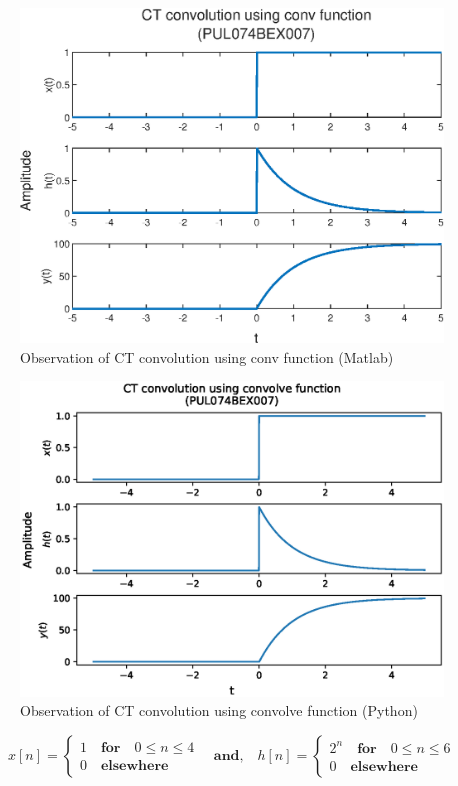 \documentclass{lab_sheet}
\begin{document}
\begin{figure}[H]
	\centering
	\includegraphics[width=0.73\linewidth]{../Figures/lab_3_2_b_ml.eps}
	\caption{Observation of CT convolution using conv function (Matlab)}
	\label{fig:3_2_b_ml}
\end{figure}
\begin{figure}[H]
	\centering
	\includegraphics[width=0.8\linewidth]{../Figures/lab_3_2_b_py.eps}
	\caption{Observation of CT convolution using convolve function (Python)}
	\label{fig:3_2_b_py}
\end{figure}
\begin{equation*}
	x[n]=\begin{cases}
		1 \quad \textbf{for} \quad 0\leq n \leq 4 \\
		0 \quad \textbf{elsewhere}
	\end{cases}
	\quad \textbf{and,} \quad h[n]=\begin{cases}
		2^n \quad \textbf{for} \quad 0\leq n \leq 6 \\
		0 \quad \textbf{elsewhere}
	\end{cases}
\end{equation*}
\end{document}
